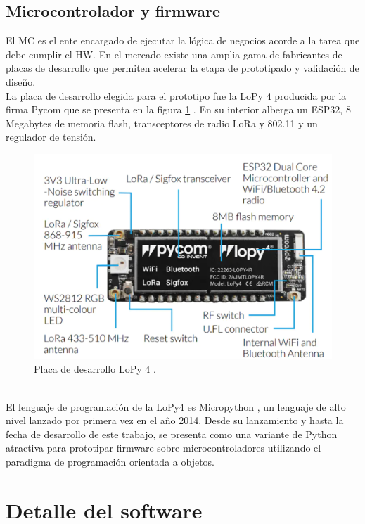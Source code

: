 \subsection{Microcontrolador y firmware}
El MC es el ente encargado de ejecutar la lógica de negocios acorde a la tarea que debe cumplir el HW. En el mercado existe una amplia gama de fabricantes de placas de desarrollo que permiten acelerar la etapa de prototipado y validación de diseño.\\
La placa de desarrollo elegida para el prototipo fue la LoPy 4 producida por la firma Pycom que se presenta en la figura \ref{fig:lopy4} . En su interior alberga un ESP32, 8 Megabytes de memoria flash, transceptores de radio LoRa y 802.11 y un regulador de tensión.\\
\begin{figure}[h]
	\centering
	\includegraphics[width=0.95\linewidth]{Figures/lopy4}
	\caption{Placa de desarrollo LoPy 4 \citep{lopy4}.}
	\label{fig:lopy4}
\end{figure}\\
El lenguaje de programación de la LoPy4 es Micropython \citep{micropy}, un lenguaje de alto nivel lanzado por primera vez en el año 2014. Desde su lanzamiento y hasta la fecha de desarrollo de este trabajo, se presenta como una variante de Python atractiva para prototipar firmware sobre microcontroladores utilizando el paradigma de programación orientada a objetos.\\


\section{Detalle del software}
